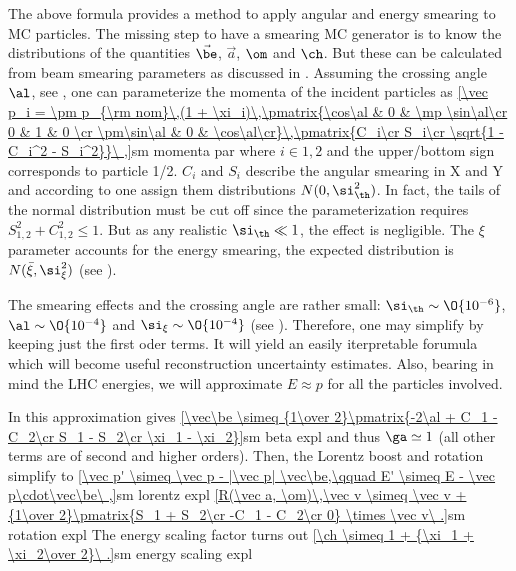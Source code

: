
The above formula provides a method to apply angular and energy smearing to MC particles. The missing step to have a smearing MC generator is to know the distributions of the quantities $\vec\be$, $\vec a$, $\om$ and $\ch$. But these can be calculated from beam smearing parameters as discussed in . Assuming the crossing angle $\al$, see , one can parameterize the momenta of the incident particles as
\eqref{\vec p_i = \pm p_{\rm nom}\,(1 + \xi_i)\,\pmatrix{\cos\al & 0 & \mp \sin\al\cr 0 & 1 & 0 \cr \pm\sin\al & 0 & \cos\al\cr}\,\pmatrix{C_i\cr S_i\cr \sqrt{1 - C_i^2 - S_i^2}}\ ,}{sm momenta par}
where $i\in {1, 2}$ and the upper/bottom sign corresponds to particle 1/2. $C_i$ and $S_i$ describe the angular smearing in X and Y and according to  one assign them distributions $N(0, \si_\th^2)$. In fact, the tails of the normal distribution must be cut off since the parameterization requires $S_{1,2}^2 + C_{1,2}^2 \leq 1$. But as any realistic $\si_\th \ll 1$, the effect is negligible. The $\xi$ parameter accounts for the energy smearing, the expected distribution is $N(\bar\xi, \si_\xi^2)$ (see ).

The smearing effects and the crossing angle are rather small: $\si_\th \sim \O{10^{-6}}$, $\al \sim \O{10^{-4}}$ and $\si_\xi \sim \O{10^{-4}}$ (see ). Therefore, one may simplify  by keeping just the first oder terms. It will yield an easily iterpretable forumula which will become useful reconstruction uncertainty estimates. Also, bearing in mind the LHC energies, we will approximate $E\approx p$ for all the particles involved.

In this approximation  gives
\eqref{\vec\be \simeq {1\over 2}\pmatrix{-2\al + C_1 - C_2\cr S_1 - S_2\cr \xi_1 - \xi_2}}{sm beta expl}
and thus $\ga\simeq 1$ (all other terms are of second and higher orders). Then, the Lorentz boost  and rotation  simplify to
\eqref{\vec p' \simeq \vec p - |\vec p| \vec\be,\qquad E' \simeq E - \vec p\cdot\vec\be\ ,}{sm lorentz expl}
\eqref{R(\vec a, \om)\,\vec v \simeq \vec v + {1\over 2}\pmatrix{S_1 + S_2\cr -C_1 - C_2\cr 0} \times \vec v\ .}{sm rotation expl}
The energy scaling factor turns out
\eqref{\ch \simeq 1 + {\xi_1 + \xi_2\over 2}\ .}{sm energy scaling expl}


